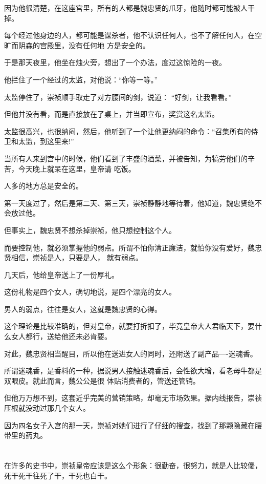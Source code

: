 \documentclass[11pt,a4paper,onecolumn]{article}
\begin{document}
因为他很清楚，在这座宫里，所有的人都是魏忠贤的爪牙，他随时都可能被人干掉。

每个经过他身边的人，都可能是谋杀者，他不认识任何人，也不了解任何人，在空旷而阴森的宫殿里，没有任何地
方是安全的。

于是那天夜里，他坐在烛火旁，想出了一个办法，度过这惊险的一夜。

他拦住了一个经过的太监，对他说：``你等一等。''

太监停住了，崇祯顺手取走了对方腰间的剑，说道： ``好剑，让我看看。''

但他并没有看，而是直接放在了桌上，并当即宣布，奖赏这名太监。

太监很高兴，也很纳闷，然后，他听到了一个让他更纳闷的命令：``召集所有的侍卫和太监，到这里来!''

当所有人来到宫中的时候，他们看到了丰盛的酒菜，并被告知，为犒劳他们的辛苦，今天晚上就呆在这里，皇帝请
吃饭。

人多的地方总是安全的。

第一天度过了，然后是第二天、第三天，崇祯静静地等待着，他知道，魏忠贤绝不会放过他。

但事实上，魏忠贤不想杀掉崇祯，他只想控制这个人。

而要控制他，就必须掌握他的弱点。所谓不怕你清正廉洁，就怕你没有爱好，魏忠贤相信，崇祯是人，只要是人，
就有弱点。

几天后，他给皇帝送上了一份厚礼。

这份礼物是四个女人，确切地说，是四个漂亮的女人。

男人的弱点，往往是女人，这就是魏忠贤的心得。

这个理论是比较准确的，但对皇帝，就要打折扣了，毕竟皇帝大人君临天下，要什么女人都行，送给他还未必肯要。

对此，魏忠贤相当醒目，所以他在送进女人的同时，还附送了副产品----迷魂香。

所谓迷魂香，是香料的一种，据说男人接触迷魂香后，会性欲大增，看老母牛都是双眼皮。就此而言，魏公公是很
体贴消费者的，管送还管销。

但他万万想不到，这套近乎完美的营销策略，却毫无市场效果。据内线报告，崇祯压根就没动过那几个女人。

因为四名女子入宫的那一天，崇祯对她们进行了仔细的搜查，找到了那颗隐藏在腰带里的药丸。

\section[\thesection]{}

在许多的史书中，崇祯皇帝应该是这么个形象：很勤奋，很努力，就是人比较傻，死干死干往死了干，干死也白干。
\end{document}
